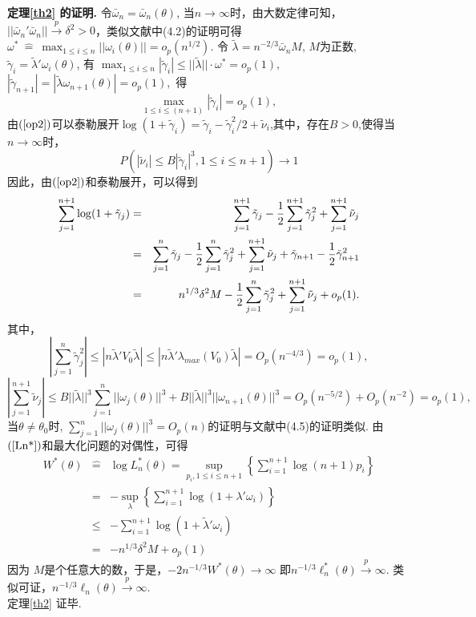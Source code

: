 \documentclass[a4paper,c5size,onecolumn,twoside,cap,Chinese]{APSart}
\begin{document}
{\bf 定理\ref{th2} 的证明. }令$\bar{\omega}_n=\bar{\omega}_n(\theta)$, 当$n \to \infty$时，由大数定律可知，$||\bar{\omega}_n'\bar{\omega}_n||\stackrel{p}{\longrightarrow}\delta^2>0$，类似文献中(4.2)的证明可得$\omega^* \ \hat{=}\  \max_{ 1\leq i\leq n} ||  \omega_i(\theta)  || =o_p(n^{1/2}) $.
 令
$\tilde\lambda=n^{-2/3}\bar{\omega}_nM$, $M$为正数, 
$\tilde\gamma_i=\tilde\lambda'\omega_i(\theta)$, 
有
$\max_{ 1\leq i\leq n}|  \tilde\gamma_i | \le  ||\tilde\lambda || \cdot \omega^*=o_p(1),$
$|  \tilde\gamma_{n+1} | =  |\tilde\lambda\omega_{n+1}(\theta)|=o_p(1),$
得
\begin{equation}
\max_{ 1\leq i\leq (n+1)} |  \tilde\gamma_i |=o_p(1) , \label{op2}
\end{equation}
由$\rm(\ref{op2}) $可以泰勒展开$\log(1+ \tilde\gamma_i)= \tilde\gamma_i- \tilde\gamma_i^2/2+ \tilde\nu_i$,其中，存在$B>0$,使得当$n \to \infty$时，
$$P(| \tilde\nu_i| \le B| \tilde\gamma_i|^3,1 \le i \le n+1) \to 1$$
因此，由$\rm(\ref{op2}) $和泰勒展开，可以得到
\begin{eqnarray*}
\sum_{j=1}^{n+1} \log(1+\tilde\gamma_j)& = &\sum_{j=1}^{n+1}\tilde\gamma_j-{1 \over 2}\sum_{j=1}^{n+1}\tilde\gamma_j^2+\sum_{j=1}^{n+1}\tilde\nu_j\\
& = & \sum_{j=1}^{n}\tilde\gamma_j-{1 \over 2}\sum_{j=1}^{n}\tilde\gamma_j^2+\sum_{j=1}^{n+1}\tilde\nu_j+\tilde\gamma_{n+1}-{1 \over 2}\tilde\gamma^2_{n+1}\\
& = & n^{1/3}\delta^2M-{1 \over 2}\sum_{j=1}^{n}\tilde\gamma_j^2+\sum_{j=1}^{n+1}\tilde\nu_j +o_p(1).
\end{eqnarray*}
其中，
$$|\sum_{j=1}^{n}\tilde\gamma_j^2|\le |n\tilde\lambda'V_0\tilde\lambda|\le |n\tilde\lambda'\lambda_{max} (V_0)\tilde\lambda|=O_p(n^{-4/3}) =o_p(1),$$
$$|\sum_{j=1}^{n+1}\tilde\nu_j|  \leq B ||\tilde\lambda||^3\sum_{j=1}^{n}||\omega_{j}(\theta)||^3+B ||\tilde\lambda||^3||\omega_{n+1}(\theta)||^3 =O_p(n^{-5/2})+O_p(n^{-2})=o_p(1),$$
当$\theta \neq \theta_0$时, $ \sum_{j=1}^{n}||\omega_{j}(\theta)||^3 =O_p(n) $的证明与文献中(4.5)的证明类似.
由$\rm(\ref{Ln*}) $和最大化问题的对偶性，可得
\begin{eqnarray*}
W^*(\theta)&\hat{=}&  \log L_n^*(\theta)=\sup_{p_i, 1\leq i\leq n+1}\left \{\sum\limits^{n+1}_{i=1}\log(n+1)p_i\right \}\\
                              & =&  -\sup\limits_{\lambda}\left \{ \sum\limits^{n+1}_{i=1}\log (1+\lambda'\omega_i) \right \}\\
                              &\le& -\sum\limits^{n+1}_{i=1}\log (1+\tilde\lambda'\omega_i) \\
                               &=&  -n^{1/3}\delta^2M+o_p(1)
\end{eqnarray*}
因为 $M$是个任意大的数，于是，$-2n^{-1/3}W^*(\theta)\to \infty$
即$n^{-1/3}\ell^*_n ({\theta} )   \stackrel{p}{\longrightarrow}\infty$.
类似可证，$n^{-1/3}\ell_n ({\theta} )   \stackrel{p}{\longrightarrow}\infty$.\\
定理\ref{th2} 证毕.
\end{document}
